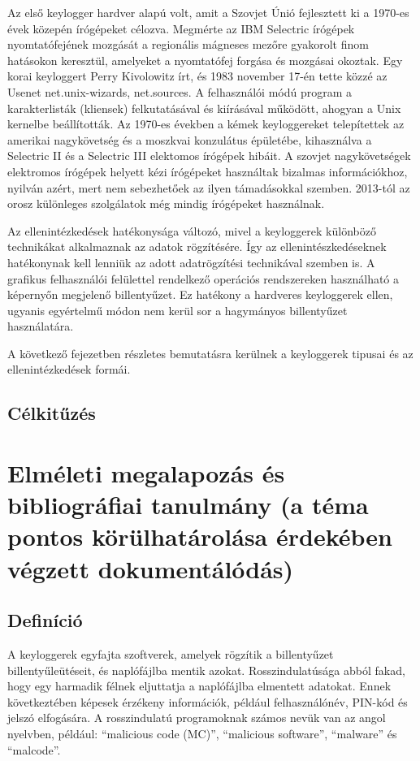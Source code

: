 \documentclass[a4paper, 11pt]{article}
\begin{document}
Az első keylogger hardver alapú volt, amit a Szovjet Únió fejlesztett ki a 1970-es évek közepén írógépeket célozva. Megmérte az IBM Selectric írógépek nyomtatófejének mozgását a regionális mágneses mezőre gyakorolt finom hatásokon keresztül, amelyeket a nyomtatófej forgása és mozgásai okoztak. Egy korai keyloggert Perry Kivolowitz írt, és 1983 november 17-én tette közzé az Usenet net.unix-wizards, net.sources. A felhasználói módú program a karakterlisták (kliensek) felkutatásával és kiírásával működött, ahogyan a Unix kernelbe beállították. Az 1970-es években a kémek keyloggereket telepítettek az amerikai nagykövetség és a moszkvai konzulátus épületébe, kihasználva a Selectric II és a Selectric III elektomos írógépek hibáit. A szovjet nagykövetségek elektromos írógépek helyett kézi írógépeket használtak bizalmas információkhoz, nyilván azért, mert nem sebezhetőek az ilyen támadásokkal szemben. 2013-tól az orosz különleges szolgálatok még mindig írógépeket használnak.

Az ellenintézkedések hatékonysága változó, mivel a keyloggerek különböző technikákat alkalmaznak az adatok rögzítésére. Így az ellenintészkedéseknek hatékonynak kell lenniük az adott adatrögzítési technikával szemben is. A grafikus felhasználói felülettel rendelkező operációs rendszereken használható a képernyőn megjelenő billentyűzet. Ez hatékony a hardveres keyloggerek ellen, ugyanis egyértelmű módon nem kerül sor a hagymányos billentyűzet használatára.

A következő fejezetben részletes bemutatásra kerülnek a keyloggerek tipusai és az ellenintézkedések formái.

\subsection{Célkitűzés}

\section{Elméleti megalapozás és bibliográfiai tanulmány (a téma pontos körülhatárolása érdekében végzett dokumentálódás)}\label{sec:bibl}
\subsection{Definíció}
\parencite{ahmed2014survey} A keyloggerek egyfajta szoftverek, amelyek rögzítik a billentyűzet billentyűleütéseit, és naplófájlba mentik azokat. Rosszindulatúsága abból fakad, hogy egy harmadik félnek eljuttatja a naplófájlba elmentett adatokat. Ennek következtében képesek érzékeny információk, például felhasználónév, PIN-kód és jelszó elfogására.  A rosszindulatú programoknak számos nevük van az angol nyelvben, például: ``malicious code (MC)'', ``malicious software'', ``malware'' és ``malcode''.
\end{document}
